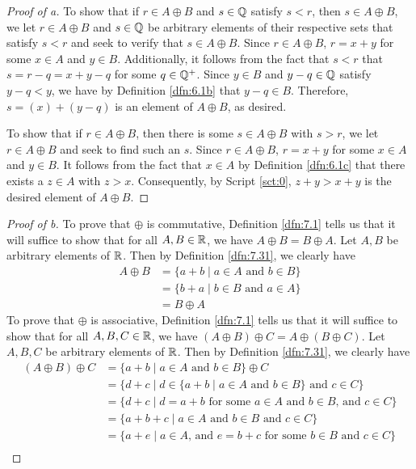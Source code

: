 \documentclass[../main.tex]{subfiles}
\begin{document}
\begin{exercise}
\begin{proof}[Proof of a]
        To show that if $r\in A\oplus B$ and $s\in\mathbb{Q}$ satisfy $s<r$, then $s\in A\oplus B$, we let $r\in A\oplus B$ and $s\in\mathbb{Q}$ be arbitrary elements of their respective sets that satisfy $s<r$ and seek to verify that $s\in A\oplus B$. Since $r\in A\oplus B$, $r=x+y$ for some $x\in A$ and $y\in B$. Additionally, it follows from the fact that $s<r$ that $s=r-q=x+y-q$ for some $q\in\mathbb{Q}^+$. Since $y\in B$ and $y-q\in\mathbb{Q}$ satisfy $y-q<y$, we have by Definition \ref{dfn:6.1b} that $y-q\in B$. Therefore, $s=(x)+(y-q)$ is an element of $A\oplus B$, as desired.\par
        To show that if $r\in A\oplus B$, then there is some $s\in A\oplus B$ with $s>r$, we let $r\in A\oplus B$ and seek to find such an $s$. Since $r\in A\oplus B$, $r=x+y$ for some $x\in A$ and $y\in B$. It follows from the fact that $x\in A$ by Definition \ref{dfn:6.1c} that there exists a $z\in A$ with $z>x$. Consequently, by Script \ref{sct:0}, $z+y>x+y$ is the desired element of $A\oplus B$.
    \end{proof}
    \begin{proof}[Proof of b]
        To prove that $\oplus$ is commutative, Definition \ref{dfn:7.1} tells us that it will suffice to show that for all $A,B\in\mathbb{R}$, we have $A\oplus B=B\oplus A$. Let $A,B$ be arbitrary elements of $\mathbb{R}$. Then by Definition \ref{dfn:7.31}, we clearly have
        \begin{align*}
            A\oplus B &= \{a+b\mid a\in A\text{ and }b\in B\}\\
            &= \{b+a\mid b\in B\text{ and }a\in A\}\\
            &= B\oplus A
        \end{align*}
        To prove that $\oplus$ is associative, Definition \ref{dfn:7.1} tells us that it will suffice to show that for all $A,B,C\in\mathbb{R}$, we have $(A\oplus B)\oplus C=A\oplus(B\oplus C)$. Let $A,B,C$ be arbitrary elements of $\mathbb{R}$. Then by Definition \ref{dfn:7.31}, we clearly have
        \begin{align*}
            (A\oplus B)\oplus C &= \{a+b\mid a\in A\text{ and }b\in B\}\oplus C\\
            &= \{d+c\mid d\in\{a+b\mid a\in A\text{ and }b\in B\}\text{ and }c\in C\}\\
            &= \{d+c\mid d=a+b\text{ for some }a\in A\text{ and }b\in B\text{, and }c\in C\}\\
            &= \{a+b+c\mid a\in A\text{ and }b\in B\text{ and }c\in C\}\\
            &= \{a+e\mid a\in A\text{, and }e=b+c\text{ for some }b\in B\text{ and }c\in C\}\\

\end{align*}
\end{proof}
\end{exercise}
\end{document}

